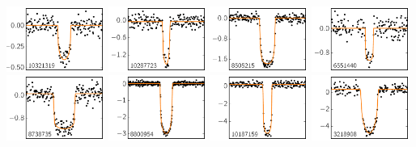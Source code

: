 \includegraphics[width=0.24\textwidth]{figures/lcs/10321319.pdf}
\includegraphics[width=0.24\textwidth]{figures/lcs/10287723.pdf}
\includegraphics[width=0.24\textwidth]{figures/lcs/8505215.pdf}
\includegraphics[width=0.24\textwidth]{figures/lcs/6551440.pdf}
\includegraphics[width=0.24\textwidth]{figures/lcs/8738735.pdf}
\includegraphics[width=0.24\textwidth]{figures/lcs/8800954.pdf}
\includegraphics[width=0.24\textwidth]{figures/lcs/10187159.pdf}
\includegraphics[width=0.24\textwidth]{figures/lcs/3218908.pdf}
